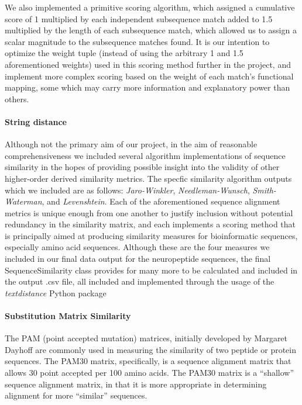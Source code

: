 \documentclass[]{article}
\let\oldparagraph\paragraph
\renewcommand{\paragraph}[1]{\oldparagraph{#1}\mbox{}}
\begin{document}
We also implemented a primitive scoring algorithm, which assigned a cumulative score of 1 multiplied by each independent subsequence match added to 1.5 multiplied by the length of each subsequence match, which allowed us to assign a scalar magnitude to the subsequence matches found. It is our intention to optimize the weight tuple (instead of using the arbitrary 1 and 1.5 aforementioned weights) used in this scoring method further in the project, and implement more complex scoring based on the weight of each match's functional mapping, some which may carry more information and explanatory power than others.

\hypertarget{string-distance}{%
\paragraph{String distance}\label{string-distance}}

Although not the primary aim of our project, in the aim of reasonable comprehensiveness we included several algorithm implementations of sequence similarity in the hopes of providing possible insight into the validity of other higher-order derived similarity metrics. The specfic similarity algorithm outputs which we included are as follows: \emph{Jaro-Winkler}, \emph{Needleman-Wunsch}, \emph{Smith-Waterman}, and \emph{Levenshtein}. Each of the aforementioned sequence alignment metrics is unique enough from one another to justify inclusion without potential redundancy in the similarity matrix, and each implements a scoring method that is principally aimed at producing similarity measures for bioinformatic sequences, especially amino acid sequences. Although these are the four measures we included in our final data output for the neuropeptide sequences, the final SequenceSimilarity class provides for many more to be calculated and included in the output .csv file, all included and implemented through the usage of the \emph{textdistance} Python package \cite{omnium_textdistance_2019}

\hypertarget{substitution-matrix-similarity}{%
\paragraph{Substitution Matrix Similarity}\label{substitution-matrix-similarity}}

The PAM (point accepted mutation) matrices, initially developed by Margaret Dayhoff are commonly used in measuring the similarity of two peptide or protein sequences. The PAM30 matrix, specifically, is a sequence alignment matrix that allows 30 point accepted per 100 amino acids. The PAM30 matrix is a ``shallow'' sequence alignment matrix, in that it is more appropriate in determining alignment for more ``similar'' sequences. 
\end{document}
